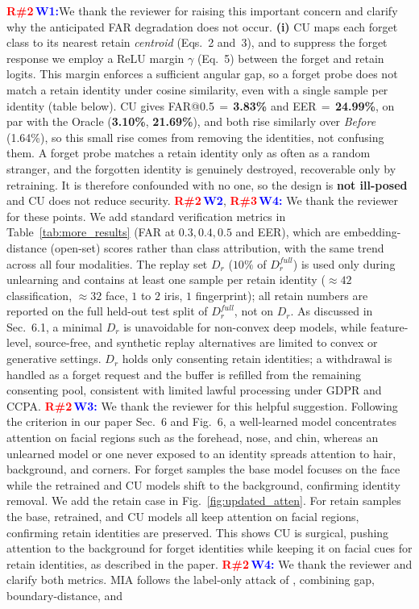 \noindent\textcolor{red}{\textbf{R\#2}}\,\textcolor{blue}{\textbf{W1:}}We thank the reviewer for raising this important concern and clarify why the anticipated FAR degradation does not occur. \textbf{(i)} CU maps each forget class to its nearest retain \emph{centroid} (Eqs.~2 and~3), and to suppress the forget response we employ a ReLU margin $\gamma$ (Eq.~5) between the forget and retain logits. This margin enforces a sufficient angular gap, so a forget probe does not match a retain identity under cosine similarity, even with a single sample per identity (table below). CU gives FAR@0.5\,$=$\,\textbf{3.83\%} and EER\,$=$\,\textbf{24.99\%}, on par with the Oracle (\textbf{3.10\%}, \textbf{21.69\%}), and both rise similarly over \emph{Before} (1.64\%), so this small rise comes from removing the identities, not confusing them. A forget probe matches a retain identity only as often as a random stranger, and the forgotten identity is genuinely destroyed, recoverable only by retraining. It is therefore confounded with no one, so the design is \textbf{not ill-posed} and CU does not reduce security. \textcolor{red}{\textbf{R\#2}}\,\textcolor{blue}{\textbf{W2}}, \textcolor{red}{\textbf{R\#3}}\,\textcolor{blue}{\textbf{W4:}} We thank the reviewer for these points. We add standard verification metrics in Table~\ref{tab:more_results} (FAR at $0.3,0.4,0.5$ and EER), which are embedding-distance (open-set) scores rather than class attribution, with the same trend across all four modalities. The replay set $D_r$ ($10\%$ of $D_r^{full}$) is used only during unlearning and contains at least one sample per retain identity ($\approx 42$ classification, $\approx 32$ face, $1$ to $2$ iris, $1$ fingerprint); all retain numbers are reported on the full held-out test split of $D_r^{full}$, not on $D_r$. As discussed in Sec.~6.1, a minimal $D_r$ is unavoidable for non-convex deep models, while feature-level, source-free, and synthetic replay alternatives are limited to convex or generative settings. $D_r$ holds only consenting retain identities; a withdrawal is handled as a forget request and the buffer is refilled from the remaining consenting pool, consistent with limited lawful processing under GDPR and CCPA. \textcolor{red}{\textbf{R\#2}}\,\textcolor{blue}{\textbf{W3:}} We thank the reviewer for this helpful suggestion. Following the criterion in our paper Sec.~6 and Fig.~6, a well-learned model concentrates attention on facial regions such as the forehead, nose, and chin, whereas an unlearned model or one never exposed to an identity spreads attention to hair, background, and corners. For forget samples the base model focuses on the face while the retrained and CU models shift to the background, confirming identity removal. We add the retain case in Fig.~\ref{fig:updated_atten}. For retain samples the base, retrained, and CU models all keep attention on facial regions, confirming retain identities are preserved. This shows CU is surgical, pushing attention to the background for forget identities while keeping it on facial cues for retain identities, as described in the paper. \textcolor{red}{\textbf{R\#2}}\,\textcolor{blue}{\textbf{W4:}} We thank the reviewer and clarify both metrics. MIA follows the label-only attack of \cite{choquette2021label}, combining gap, boundary-distance, and 